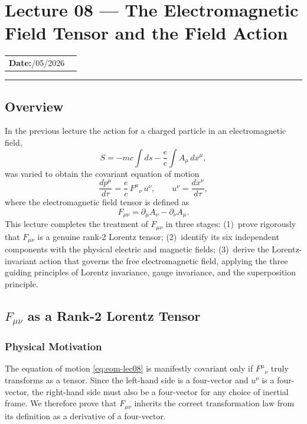 \section{Lecture 08 — The Electromagnetic Field Tensor and the Field Action}\label{sec:lec08}

\begin{center}
\begin{tabular}{ll}
  \textbf{Date:}\quad 03/05/2026 & \\
\end{tabular}
\end{center}
\hrule\vspace{1.5em}

\subsection*{Overview}
In the previous lecture the action for a charged particle in an electromagnetic field,
\begin{equation}
  S = -mc\int ds - \frac{e}{c}\int A_\mu\,dx^\mu,
\end{equation}
was varied to obtain the covariant equation of motion
\begin{equation}\label{eq:eom-lec08}
  \frac{dp^\mu}{d\tau} = \frac{e}{c}\,F^{\mu}{}_\nu\,u^\nu,
  \qquad u^\nu = \frac{dx^\nu}{d\tau},
\end{equation}
where the electromagnetic field tensor is defined as
\begin{equation}\label{eq:F-def}
  F_{\mu\nu} = \partial_\mu A_\nu - \partial_\nu A_\mu.
\end{equation}
This lecture completes the treatment of $F_{\mu\nu}$ in three stages: (1)~prove rigorously that $F_{\mu\nu}$ is a genuine rank-2 Lorentz tensor; (2)~identify its six independent components with the physical electric and magnetic fields; (3)~derive the Lorentz-invariant action that governs the free electromagnetic field, applying the three guiding principles of Lorentz invariance, gauge invariance, and the superposition principle.

\subsection{$F_{\mu\nu}$ as a Rank-2 Lorentz Tensor}\label{subsec:F-tensor}

\subsubsection*{Physical Motivation}
The equation of motion \eqref{eq:eom-lec08} is manifestly covariant only if $F^{\mu}{}_\nu$ truly transforms as a tensor.  Since the left-hand side is a four-vector and $u^\nu$ is a four-vector, the right-hand side must also be a four-vector for any choice of inertial frame.  We therefore prove that $F_{\mu\nu}$ inherits the correct transformation law from its definition as a derivative of a four-vector.

